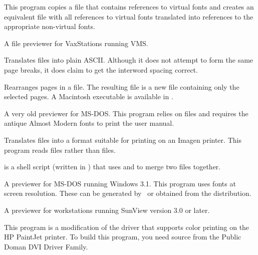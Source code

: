 
This program copies a  file that contains references to virtual
fonts and creates an equivalent  file with all references to
virtual fonts translated into references to the appropriate non-virtual
fonts.


A  file previewer for VaxStations running VMS.


Translates  files into plain ASCII.  Although it does not attempt
to form the same page breaks, it does claim to get the interword spacing
correct.

\newpage
{}

Rearranges pages in a  file.  The resulting file is a new 
file containing only the selected pages.  A Macintosh executable is
available in .


A very old previewer for MS-DOS.  This program relies on  files
and requires the antique Almost Modern fonts to print the user
manual.


Translates  files into a format suitable for printing
on an Imagen printer.  This program reads  files rather
than  files.


 is a shell script (written in ) that
uses  and  to merge two 
files together.


A  previewer for MS-DOS running Windows 3.1.  This program
uses  fonts at screen resolution.  These can be generated
by \MF\ or obtained from the  distribution.


A  previewer for workstations running SunView version 3.0 or
later.


This program is a modification of the  driver that
supports color printing on the HP PaintJet printer.  To build
this program, you need source from the Public Doman DVI Driver Family.

